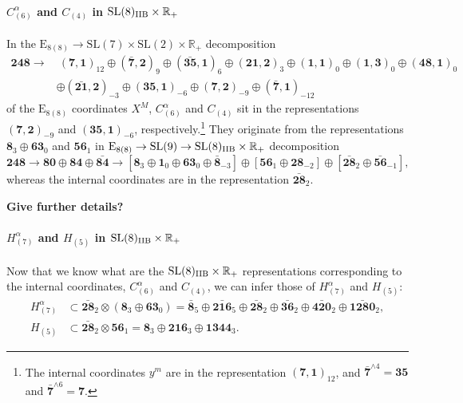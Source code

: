 \documentclass[11pt]{article}
\newcommand{\SL}{\ensuremath{\mathrm{SL}}\xspace}
\newcommand{\E}{\ensuremath{\mathrm{E}}\xspace}
\newcommand{\R}{\ensuremath{\mathbb{R}}\xspace}
\newcommand{\ce}[1]{\marginpar{\parbox{\marginparwidth}{\boldmath $\Longleftarrow$}}
{\boldmath\bfseries #1}}
\begin{document}
\paragraph{\boldmath $C_{(6)}^{\alpha}$ and $C_{(4)}$ in $\SL(8)_{\rm IIB}\times\R_{+}$} In the $\E_{8(8)}\rightarrow\SL(7)\times\SL(2)\times\R_{+}$ decomposition
\begin{equation}
  \begin{aligned}
    \bm{248} \longrightarrow & \ (\bm{7},\bm{1})_{12} \oplus (\bm{\bar{7}},\bm{2})_{9} \oplus (\bm{\bar{35}},\bm{1})_{6} \oplus (\bm{21},\bm{2})_{3} \oplus (\bm{1},\bm{1})_{0} \oplus (\bm{1},\bm{3})_{0} \oplus (\bm{48},\bm{1})_{0} \\
    & \oplus (\bm{\bar{21}},\bm{2})_{-3} \oplus (\bm{35},\bm{1})_{-6} \oplus (\bm{7},\bm{2})_{-9} \oplus (\bm{\bar{7}},\bm{1})_{-12}
  \end{aligned} 
\end{equation}
of the $\E_{8(8)}$ coordinates $X^{M}$, $C_{(6)}^{\alpha}$ and $C_{(4)}$ sit in the representations $(\bm{7},\bm{2})_{-9}$ and $(\bm{35},\bm{1})_{-6}$, respectively.\footnote{The internal coordinates $y^{m}$ are in the representation $(\bm{7},\bm{1})_{12}$, and $\bm{\bar{7}}^{\wedge 4}=\bm{35}$ and $\bm{\bar{7}}^{\wedge 6}=\bm{7}$.} They originate from the representations $\bm{8}_{3}\oplus\bm{63}_{0}$ and $\bm{56}_{1}$ in $\E_{8(8)}\rightarrow\SL(9)\rightarrow\SL(8)_{\rm IIB}\times\R_{+}$ decomposition
\begin{equation}
  \bm{248} \longrightarrow \bm{80} \oplus \bm{84} \oplus \bm{\bar{84}} \longrightarrow \left[\bm{8}_{3} \oplus \bm{1}_{0} \oplus \bm{63}_{0} \oplus \bm{\bar{8}}_{-3}\right] \oplus \left[\bm{56}_{1} \oplus \bm{28}_{-2}\right] \oplus \left[\bm{\bar{28}}_{2} \oplus \bm{\bar{56}}_{-1}\right],
\end{equation}
whereas the internal coordinates are in the representation $\bm{\bar{28}}_{2}$.

\ce{Give further details?}

\paragraph{\boldmath $H_{(7)}^{\alpha}$ and $H_{(5)}$ in $\SL(8)_{\rm IIB}\times\R_{+}$} Now that we know what are the $\SL(8)_{\rm IIB}\times\R_{+}$ representations corresponding to the internal coordinates, $C_{(6)}^{\alpha}$ and $C_{(4)}$, we can infer those of $H_{(7)}^{\alpha}$ and $H_{(5)}$:
\begin{equation}  \label{eq:H7H5inIIB}
  \begin{aligned}
    H_{(7)}^{\alpha} & \subset \bm{\bar{28}}_{2} \otimes \left(\bm{8}_{3}\oplus\bm{63}_{0}\right) = \bm{\bar{8}}_{5} \oplus \bm{\bar{216}}_{5} \oplus \bm{\bar{28}}_{2} \oplus \bm{\bar{36}}_{2} \oplus \bm{\bar{420}}_{2} \oplus \bm{\bar{1280}}_{2}, \\
    H_{(5)} & \subset \bm{\bar{28}}_{2} \otimes \bm{56}_{1} = \bm{8}_{3} \oplus \bm{216}_{3} \oplus \bm{1344}_{3}.
  \end{aligned}
\end{equation}
\end{document}
